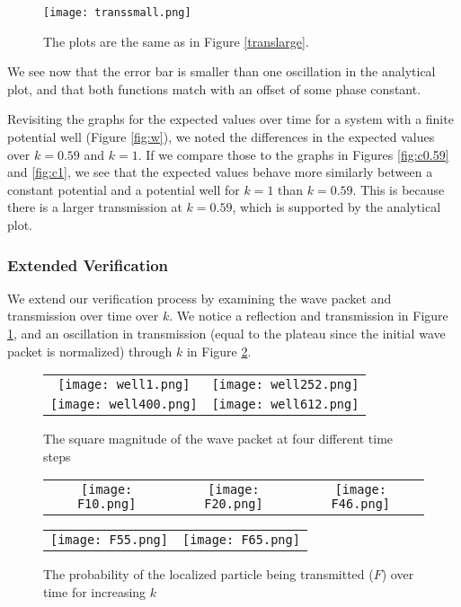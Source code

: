 \begin{figure}[H]
    \centering
    \texttt{[image: transsmall.png]}
    \caption[Small Well Transmission]{The plots are the same as in Figure
    \ref{translarge}.}
\end{figure}

We see now that the error bar is smaller than one oscillation in the
analytical plot, and that both functions match with an offset of some phase
constant.

Revisiting the graphs for the expected values over time for a system with a
finite potential well (Figure \ref{fig:w}), we noted the differences in the
expected values over $k = 0.59$ and $k = 1$. If we compare those to the
graphs in Figures \ref{fig:c0.59} and \ref{fig:c1}, we see that the expected
values behave more similarly between a constant potential and a potential
well for $k = 1$ than $k = 0.59$. This is because there is a larger
transmission at $k = 0.59$, which is supported by the analytical plot.

\subsubsection*{Extended Verification}

We extend our verification process by examining the wave packet and
transmission over time over $k$. We notice a reflection and transmission in
Figure \ref{fig:wellanim}, and an oscillation in transmission (equal to the
plateau since the initial wave packet is normalized) through $k$ in Figure
\ref{fig:Fanim}.

\begin{figure}[H]
    \centering
    \begin{tabular}{cc}
        \texttt{[image: well1.png]}
        &
        \texttt{[image: well252.png]}
        \\
        \texttt{[image: well400.png]}
        &
        \texttt{[image: well612.png]}
    \end{tabular}
    \caption[Well Propagation]{The square magnitude of the wave packet at
    four different time steps}
    \label{fig:wellanim}
\end{figure}

\begin{figure}[H]
    \centering
    \begin{tabular}{ccc}
        \texttt{[image: F10.png]}
        &
        \texttt{[image: F20.png]}
        &
        \texttt{[image: F46.png]}
    \end{tabular}
    \begin{tabular}{cc}
        \texttt{[image: F55.png]}
        &
        \texttt{[image: F65.png]}
    \end{tabular}
    \caption[Transmission Probabilities]{The probability of the localized
    particle being transmitted ($F$) over time for increasing $k$}
    \label{fig:Fanim}
\end{figure}
